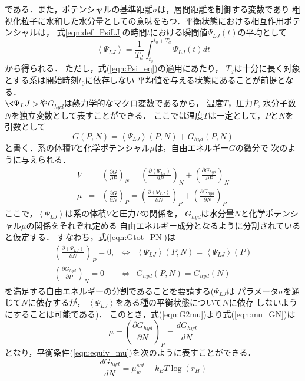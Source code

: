 である．また，ポテンシャルの基準距離$\sigma$は，層間距離を制御する変数であり
粗視化粒子に水和した水分量としての意味をもつ．平衡状態における相互作用ポテンシャルは，
式\ref{eqn:def_PsiLJ}の時間$t$における瞬間値$\Psi_{LJ}(t)$の平均として
\begin{equation}
	\left< \Psi_{LJ}\right>
	=
	\frac{1}{T_d}\int_{t_0}^{t_0+T_d} \Psi_{LJ}(t)dt
	\label{eqn:Psi_eq}
\end{equation}
から得られる． ただし，式(\ref{eqn:Psi_eq})の適用にあたり，
$T_d$は十分に長く対象とする系は開始時刻$t_0$に依存しない
平均値を与える状態にあることが前提となる．\\
\hspace{\parindent}
$\<\Psi_LJ >$や$G_{hyd}$は熱力学的なマクロ変数であるから，
温度$T$，圧力$P$, 水分子数$N$を独立変数として表すことができる．
ここでは温度$T$は一定として，$P$と$N$を引数として
\begin{equation}
	G(P,N)=\left< \Psi_{LJ} \right>(P,N) +G_{hyd}(P,N)
	\label{eqn:Gtot_PN}
\end{equation}
と書く．系の体積$V$と化学ポテンシャル$\mu$は，自由エネルギー$G$の微分で
次のように与えられる．
\begin{eqnarray}
	V &= & 
	\left( \frac{\partial G}{\partial P} \right)_N 
	=
	\left( \frac{\partial \left< \Psi_{LJ}\right>}{\partial P} \right)_N 
	+
	\left( \frac{\partial G_{hyd}}{\partial P} \right)_N 
	\label{eqn:G2V}
	\\
	\mu &= & \left( \frac{\partial G}{\partial N} \right)_P 
	=
	\left( \frac{\partial \left< \Psi_{LJ}\right>}{\partial N} \right)_P 
	+
	\left( \frac{\partial G_{hyd}}{\partial N} \right)_P 
	\label{eqn:G2mu}
\end{eqnarray}
ここで，$\left<\Psi_{LJ}\right>$は系の体積$V$と圧力$P$の関係を，
$G_{hyd}$は水分量$N$と化学ポテンシャル$\mu$の関係をそれぞれ定める
自由エネルギー成分となるように分割されていると仮定する．
すなわち，式(\ref{eqn:Gtot_PN})は
\begin{eqnarray}
	\left( \frac{\partial \left< \Psi_{LJ}\right>}{\partial N} \right)_P=0, 
	& \Leftrightarrow & 
	\left< \Psi_{LJ}\right>(P,N) = \left< \Psi_{LJ}\right>(P) 
	\label{eqn:assuption1}
	\\ 
	\left( \frac{\partial G_{hyd}}{\partial P} \right)_N =0
	& \Leftrightarrow & 
	 G_{hyd}(P,N) = G_{hyd}(N) 
	\label{eqn:G2mu}
	\label{eqn:asumption2}
\end{eqnarray}
を満足する自由エネルギーの分割であることを要請する($\Psi_{LJ}$は
パラメータ$\sigma$を通じて$N$に依存するが，
$\left<\Psi_{LJ}\right>$をある種の平衡状態について$N$に依存
しないようにすることは可能である)．
このとき，式(\ref{eqn:G2mu})より式(\ref{eqn:mu_GN})は
\begin{equation}
	\mu= \left( \frac{\partial G_{hyd}}{\partial N} \right)_P 
	=
	\frac{dG_{hyd}}{dN}
	\label{eqn:G2mu_2}
\end{equation}
となり，平衡条件(\ref{eqn:equiv_mu})を次のように表すことができる．
\begin{equation}
	\frac{d G_{hyd}}{d N}
	=
	\mu_w^{sat} +k_BT \log \left( r_H \right)
	\label{eqn:mu_hyd}
\end{equation}
